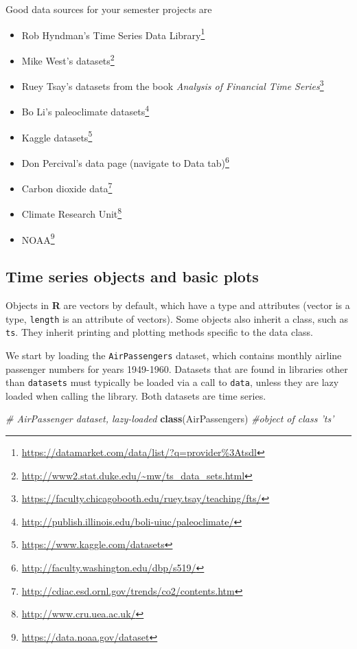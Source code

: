 \documentclass[]{book}
\newenvironment{Shaded}{\begin{snugshade}}{\end{snugshade}}
\newcommand{\CommentTok}[1]{\textcolor[rgb]{0.56,0.35,0.01}{\textit{#1}}}
\newcommand{\KeywordTok}[1]{\textcolor[rgb]{0.13,0.29,0.53}{\textbf{#1}}}
\newcommand{\NormalTok}[1]{#1}
\providecommand{\tightlist}{%
  \setlength{\itemsep}{0pt}\setlength{\parskip}{0pt}}
\let\rmarkdownfootnote\footnote%
\def\footnote{\protect\rmarkdownfootnote}
\renewcommand{\href}[2]{#2\footnote{\url{#1}}}
\begin{document}
Good data sources for your semester projects are

\begin{itemize}
\tightlist
\item
  \href{https://datamarket.com/data/list/?q=provider\%3Atsdl}{Rob Hyndman's Time Series Data Library}
\item
  \href{http://www2.stat.duke.edu/~mw/ts_data_sets.html}{Mike West's datasets}
\item
  \href{https://faculty.chicagobooth.edu/ruey.tsay/teaching/fts/}{Ruey Tsay's datasets from the book \emph{Analysis of Financial Time Series}}
\item
  \href{http://publish.illinois.edu/boli-uiuc/paleoclimate/}{Bo Li's paleoclimate datasets}
\item
  \href{https://www.kaggle.com/datasets}{Kaggle datasets}
\item
  \href{http://faculty.washington.edu/dbp/s519/}{Don Percival's data page (navigate to Data tab)}
\item
  \href{http://cdiac.esd.ornl.gov/trends/co2/contents.htm}{Carbon dioxide data}
\item
  \href{http://www.cru.uea.ac.uk/}{Climate Research Unit}
\item
  \href{https://data.noaa.gov/dataset}{NOAA}
\end{itemize}

\hypertarget{time-series-objects-and-basic-plots}{%
\subsection{Time series objects and basic plots}\label{time-series-objects-and-basic-plots}}

Objects in \textbf{R} are vectors by default, which have a type and attributes (vector is a type, \texttt{length} is an attribute of vectors). Some objects also inherit a class, such as \texttt{ts}. They inherit printing and plotting methods specific to the data class.

We start by loading the \texttt{AirPassengers} dataset, which contains monthly airline passenger numbers for years 1949-1960. Datasets that are found in libraries other than \texttt{datasets} must typically be loaded via a call to \texttt{data}, unless they are lazy loaded when calling the library. Both datasets are time series.

\begin{Shaded}
\begin{Highlighting}[]
\CommentTok{# AirPassenger dataset, lazy-loaded}
\KeywordTok{class}\NormalTok{(AirPassengers)  }\CommentTok{#object of class 'ts'}
\end{Highlighting}
\end{Shaded}
\end{document}

